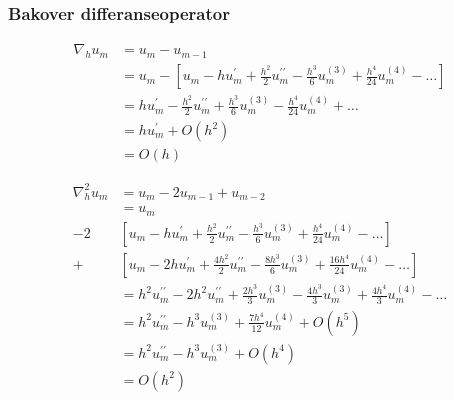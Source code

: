 \subsubsection{Bakover differanseoperator}
\begin{align*}
  \nabla_h u_m & = u_m - u_{m-1}                                                                                                                            \\
               & = u_m - \left[u_m - h u_m^{\prime} + \frac{h^2}{2} u_m^{\prime\prime} - \frac{h^3}{6} u_m^{(3)} + \frac{h^4}{24} u_m^{(4)} - \hdots\right] \\
               & = h u_m^{\prime} - \frac{h^2}{2} u_m^{\prime\prime} + \frac{h^3}{6} u_m^{(3)} - \frac{h^4}{24} u_m^{(4)} + \hdots                          \\
               & = h u_m^{\prime} + O(h^2)                                                                                                                  \\
               & = O(h)
\end{align*}

\begin{align*}
  \nabla_h^2 u_m & = u_m - 2u_{m-1} + u_{m-2}                                                                                                                   \\
                 & = u_m                                                                                                                                        \\
  - 2            & \left[u_m - h u_m^{\prime} + \frac{h^2}{2} u_m^{\prime\prime} - \frac{h^3}{6} u_m^{(3)} + \frac{h^4}{24} u_m^{(4)} - \hdots\right]           \\
  +              & \left[u_m - 2h u_m^{\prime} + \frac{4h^2}{2} u_m^{\prime\prime} - \frac{8h^3}{6} u_m^{(3)} + \frac{16h^4}{24} u_m^{(4)} - \hdots\right]      \\
                 & = h^2 u_m^{\prime\prime} - 2h^2 u_m^{\prime\prime} + \frac{2h^3}{3} u_m^{(3)} - \frac{4h^3}{3} u_m^{(3)} + \frac{4h^4}{3} u_m^{(4)} - \hdots \\
                 & = h^2 u_m^{\prime\prime} - h^3 u_m^{(3)} + \frac{7h^4}{12} u_m^{(4)} + O(h^5)                                                                \\
                 & = h^2 u_m^{\prime\prime} - h^3 u_m^{(3)} + O(h^4)                                                                                            \\
                 & = O(h^2)
\end{align*}


